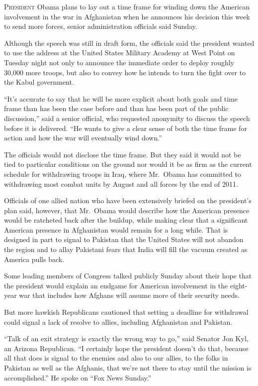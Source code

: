 ﻿\documentclass[12pt]{article}
\begin{document}
\lettrine{P}{resident} Obama plans to lay out a time frame for winding down
the American involvement in the war in Afghanistan when he announces his decision this week to send
more forces, senior administration officials said Sunday.

Although the speech was still in draft form, the officials said the president wanted to use the
address at the United States Military Academy at West Point on Tuesday night not only to announce
the immediate order to deploy roughly 30,000 more troops, but also to convey how he intends to turn
the fight over to the Kabul government.

``It's accurate to say that he will be more explicit about both goals and time frame than has been
the case before and than has been part of the public discussion,'' said a senior official, who
requested anonymity to discuss the speech before it is delivered. ``He wants to give a clear sense
of both the time frame for action and how the war will eventually wind down.''

The officials would not disclose the time frame. But they said it would not be tied to particular
conditions on the ground nor would it be as firm as the current schedule for withdrawing troops in
Iraq, where Mr.~Obama has committed to withdrawing most combat units by August and all forces by the
end of 2011.

Officials of one allied nation who have been extensively briefed on the president's plan said,
however, that Mr.~Obama would describe how the American presence would be ratcheted back after the
buildup, while making clear that a significant American presence in Afghanistan would remain for a
long while. That is designed in part to signal to Pakistan that the United States will not abandon
the region and to allay\cite{allay} Pakistani fears that India will fill the vacuum created as
America pulls back.

Some leading members of Congress talked publicly Sunday about their hope that the president would
explain an endgame for American involvement in the eight-year war that includes how Afghans will
assume more of their security needs.

But more hawkish Republicans cautioned that setting a deadline for withdrawal could signal a lack of
resolve to allies, including Afghanistan and Pakistan.

``Talk of an exit strategy is exactly the wrong way to go,'' said Senator Jon Kyl, an Arizona
Republican. ``I certainly hope the president doesn't do that, because all that does is signal to the
enemies and also to our allies, to the folks in Pakistan as well as the Afghanis, that we're not
there to stay until the mission is accomplished.'' He spoke on ``Fox News Sunday.''
\end{document}
